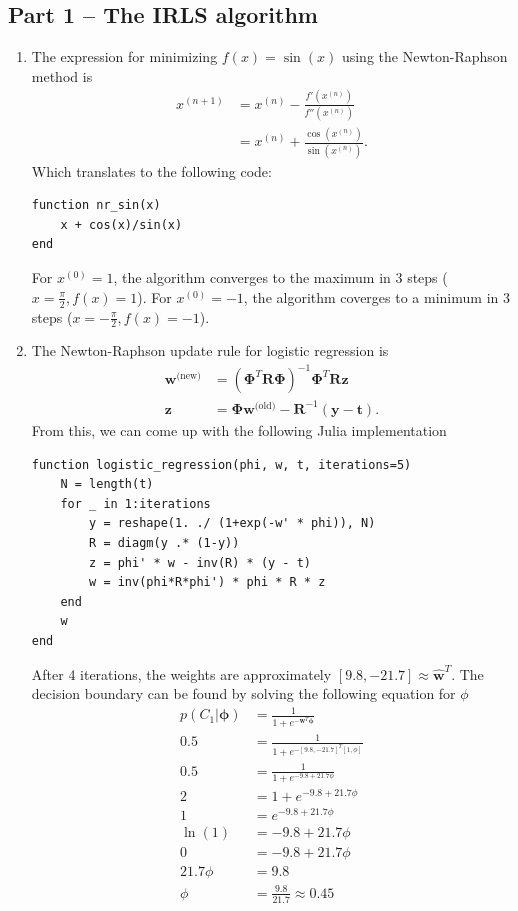\documentclass{article}
\begin{document}
\subsection*{Part 1 -- The IRLS algorithm}
\begin{enumerate}
\item
The expression for minimizing $f(x) = \sin(x)$ using the Newton-Raphson method is
\begin{align*}
x^{(n+1)}&=x^{(n)} - \frac{f'(x^{(n)})}{f''(x^{(n)})} \\
&=x^{(n)} + \frac{\cos(x^{(n)})}{\sin(x^{(n)})}.
\end{align*}
Which translates to the following code:
\begin{lstlisting}
function nr_sin(x)
    x + cos(x)/sin(x)
end
\end{lstlisting}
For $x^{(0)}=1$, the algorithm converges to the maximum in 3 steps ($x=\frac{\pi}{2}, f(x)=1$). For $x^{(0)}=-1$, the algorithm coverges to a minimum in 3 steps ($x=-\frac{\pi}{2}, f(x)=-1$).
\item The Newton-Raphson update rule for logistic regression is
\begin{align*}
\bm{w}^{\text{(new)}}&=(\bm{\Phi}^T\bm{R}\bm{\Phi})^{-1}\bm{\Phi}^T\bm{R}\textbf{z} \\
\textbf{z}&=\bm{\Phi}\bm{w}^{\text{(old)}}-\bm{R}^{-1}(\textbf{y} - \textbf{t}).
\end{align*}
From this, we can come up with the following Julia implementation
\begin{lstlisting}
function logistic_regression(phi, w, t, iterations=5)
    N = length(t)
    for _ in 1:iterations
        y = reshape(1. ./ (1+exp(-w' * phi)), N)
        R = diagm(y .* (1-y))
        z = phi' * w - inv(R) * (y - t)
        w = inv(phi*R*phi') * phi * R * z
    end
    w
end
\end{lstlisting}
After 4 iterations, the weights are approximately $[9.8, -21.7]\approx\hat{\bm{w}}^T$.
The decision boundary can be found by solving the following equation for $\phi$
\begin{align*}
p(C_1|\bm{\phi}) &= \frac{1}{1+e^{-\bm{w}^T\bm{\phi}}} \\
0.5 &=  \frac{1}{1+e^{-[9.8, -21.7]^T [1, \phi]}} \\
0.5 &=  \frac{1}{1+e^{-9.8 + 21.7\phi}} \\
2 &=  1+e^{-9.8 + 21.7\phi} \\
1 &=  e^{-9.8 + 21.7\phi} \\
\ln(1) &=  -9.8 + 21.7\phi \\
0 &=  -9.8 + 21.7\phi \\
21.7\phi &=  9.8 \\
\phi &= \frac{9.8}{21.7} \approx 0.45
\end{align*}
\end{enumerate}
\end{document}
